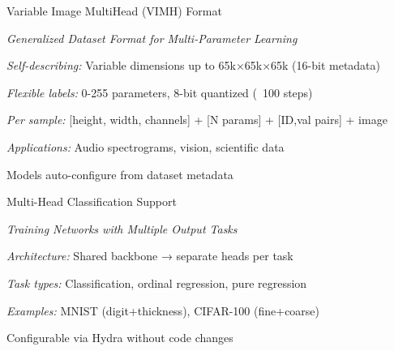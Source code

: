 \begin{slidewhite}[\slideopts,toc={VIMH}]{Variable Image MultiHead (VIMH) Format}
  \vspace{-1em}
  
  \emph{Generalized Dataset Format for Multi-Parameter Learning}
  
  \begin{itemize}
    \mpitem \emph{Self-describing:} Variable dimensions up to 65k×65k×65k (16-bit metadata)
    
    \mpitem \emph{Flexible labels:} 0-255 parameters, 8-bit quantized (~100 steps)
    
    \mpitem \emph{Per sample:} [height, width, channels] + [N params] + [ID,val pairs] + image
    
    \mpitem \emph{Applications:} Audio spectrograms, vision, scientific data
    
    \mpitem Models auto-configure from dataset metadata
  \end{itemize}
  \vspace{-4em}
\end{slidewhite}
  


\begin{slide}[\slideopts,toc={MultiHead}]{Multi-Head Classification Support}
  
  \emph{Training Networks with Multiple Output Tasks}
  
  \begin{itemize}
    \mpitem \emph{Architecture:} Shared backbone → separate heads per task
    
    \mpitem \emph{Task types:} Classification, ordinal regression, pure regression
    
    \mpitem \emph{Examples:} MNIST (digit+thickness), CIFAR-100 (fine+coarse)
    
    \mpitem Configurable via Hydra without code changes
  \end{itemize}
  
  \scalebox{0.7}{
    
  }
\end{slide}

